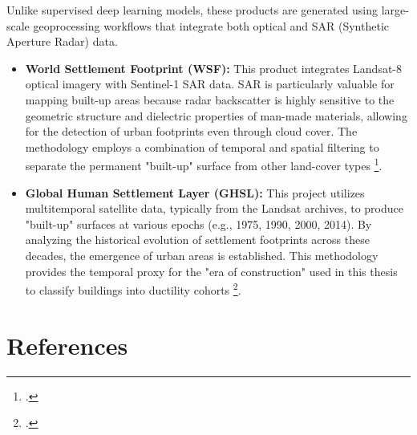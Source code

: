 \begin{refsection}
Unlike supervised deep learning models, these products are generated using large-scale geoprocessing workflows that integrate both optical and SAR (Synthetic Aperture Radar) data.
\begin{itemize}
\item \textbf{World Settlement Footprint (WSF):} This product integrates Landsat-8 optical imagery with Sentinel-1 SAR data. SAR is particularly valuable for mapping built-up areas because radar backscatter is highly sensitive to the geometric structure and dielectric properties of man-made materials, allowing for the detection of urban footprints even through cloud cover. The methodology employs a combination of temporal and spatial filtering to separate the permanent "built-up" surface from other land-cover types \footcite{marconcini_outlining_2020}.
\item \textbf{Global Human Settlement Layer (GHSL):} This project utilizes multitemporal satellite data, typically from the Landsat archives, to produce "built-up" surfaces at various epochs (e.g., 1975, 1990, 2000, 2014). By analyzing the historical evolution of settlement footprints across these decades, the emergence of urban areas is established. This methodology provides the temporal proxy for the "era of construction" used in this thesis to classify buildings into ductility cohorts \footcite{pesaresi_advances_2024}.
\end{itemize}


\newpage
\renewcommand{\sectionnametext}{References}
\renewcommand{\headingtextR}{\thesection. \sectionnametext}
\section{\sectionnametext}
\printbibliography[heading=none]
\end{refsection}